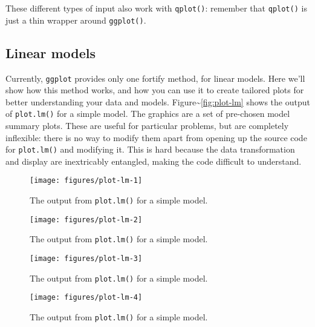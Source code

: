 These different types of input also work with \texttt{qplot()}: remember
that \texttt{qplot()} is just a thin wrapper around \texttt{ggplot()}.

\subsection{Linear models}

Currently, \texttt{ggplot} provides only one fortify method, for linear
models. Here we'll show how this method works, and how you can use it to
create tailored plots for better understanding your data and models.
Figure\textasciitilde{}\ref{fig:plot-lm} shows the output of
\texttt{plot.lm()} for a simple model. The graphics are a set of
pre-chosen model summary plots. These are useful for particular
problems, but are completely inflexible: there is no way to modify them
apart from opening up the source code for \texttt{plot.lm()} and
modifying it. This is hard because the data transformation and display
are inextricably entangled, making the code difficult to understand.
  

\begin{Shaded}
\begin{Highlighting}[]
\StringTok{ }\StringTok{ } 
\end{Highlighting}
\end{Shaded}

\begin{figure}
\texttt{[image: figures/plot-lm-1]} \caption{The output from \texttt{plot.lm()} for a simple model.\label{fig:plot-lm1}}
\end{figure}\begin{figure}
\texttt{[image: figures/plot-lm-2]} \caption{The output from \texttt{plot.lm()} for a simple model.\label{fig:plot-lm2}}
\end{figure}\begin{figure}
\texttt{[image: figures/plot-lm-3]} \caption{The output from \texttt{plot.lm()} for a simple model.\label{fig:plot-lm3}}
\end{figure}\begin{figure}
\texttt{[image: figures/plot-lm-4]} \caption{The output from \texttt{plot.lm()} for a simple model.\label{fig:plot-lm4}}
\end{figure}

